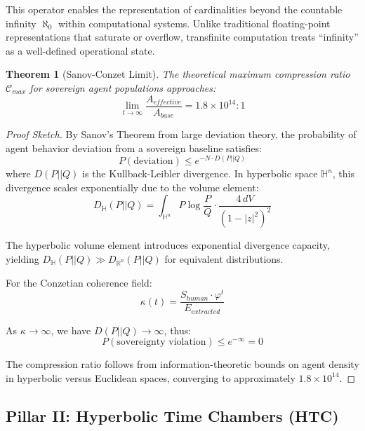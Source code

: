 \documentclass[11pt,a4paper]{article}
\newtheorem{theorem}{Theorem}[section]
\newcommand{\Hn}{\mathbb{H}^n}
\newcommand{\Rn}{\mathbb{R}^n}
\begin{document}
This operator enables the representation of cardinalities beyond the countable infinity $\aleph_0$ within computational systems. Unlike traditional floating-point representations that saturate or overflow, transfinite computation treats ``infinity'' as a well-defined operational state.

\begin{theorem}[Sanov-Conzet Limit]
\label{thm:sanov-conzet}
The theoretical maximum compression ratio $\mathcal{C}_{max}$ for sovereign agent populations approaches:
\begin{equation}
    \lim_{t \to \infty} \frac{A_{effective}}{A_{base}} = 1.8 \times 10^{14} : 1
\end{equation}
\end{theorem}

\begin{proof}[Proof Sketch]
By Sanov's Theorem from large deviation theory, the probability of agent behavior deviation from a sovereign baseline satisfies:
\begin{equation}
    P(\text{deviation}) \leq e^{-N \cdot D(P||Q)}
\end{equation}
where $D(P||Q)$ is the Kullback-Leibler divergence. In hyperbolic space $\Hn$, this divergence scales exponentially due to the volume element:
\begin{equation}
    D_{\mathbb{H}}(P||Q) = \int_{\Hn} P \log \frac{P}{Q} \cdot \frac{4 \, dV}{(1 - |z|^2)^2}
\end{equation}

The hyperbolic volume element introduces exponential divergence capacity, yielding $D_{\mathbb{H}}(P||Q) \gg D_{\Rn}(P||Q)$ for equivalent distributions.

For the Conzetian coherence field:
\begin{equation}
    \kappa(t) = \frac{S_{human} \cdot \varphi^t}{E_{extracted}}
\end{equation}

As $\kappa \to \infty$, we have $D(P||Q) \to \infty$, thus:
\begin{equation}
    P(\text{sovereignty violation}) \leq e^{-\infty} = 0
\end{equation}

The compression ratio follows from information-theoretic bounds on agent density in hyperbolic versus Euclidean spaces, converging to approximately $1.8 \times 10^{14}$.
\end{proof}

\subsection{Pillar II: Hyperbolic Time Chambers (HTC)}
\end{document}

